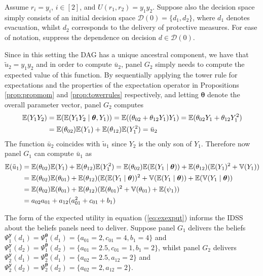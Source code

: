 Assume  $r_i=y_i$, $i\in[2]$, and $U(r_1,r_2)=y_1y_2$. Suppose also the decision space simply consists of an initial decision space $\mathcal{D}(0)=\{d_1,d_2\}$, where $d_1$ denotes evacuation, whilst $d_2$ corresponds to the delivery of protective measures. For ease of notation, suppress the dependence on decision $d\in\mathcal{D}(0)$.

Since in this setting the DAG has a unique ancestral component, we have that $\tilde{u}_2=y_1y_2$ and in order to compute $\bar{u}_2$, panel $G_2$ simply needs to compute the expected value of this function. By sequentially applying the tower rule for expectations and the properties of the expectation operator in Propositions \ref{prop:propmom} and \ref{prop:towerrules} respectively, and letting $\bm{\theta}$ denote the overall parameter vector, panel $G_2$ computes 
\begin{align*}
\mathbb{E}(Y_1Y_2)&=\mathbb{E}(\mathbb{E}(Y_1Y_2\;|\;\bm{\theta},Y_1))=\mathbb{E}((\theta_{02}+\theta_{12}Y_1)Y_1)=\mathbb{E}(\theta_{02}Y_1+\theta_{12}Y_1^2)\\
&=\mathbb{E}(\theta_{02})\mathbb{E}(Y_1)+\mathbb{E}(\theta_{12})\mathbb{E}(Y_1^2)=\bar{u}_2
\end{align*}
The function $\bar{u}_2$ coincides with $\tilde{u}_1$ since $Y_2$ is the only son of $Y_1$. Therefore now panel $G_1$ can compute $\bar{u}_1$ as
\begin{align}
\E(\tilde{u}_1)&=\E(\theta_{02})\E(Y_1)+\E(\theta_{12})\E(Y_1^2)=\E(\theta_{02})\E(\E(Y_1\;|\;\bm{\theta}))+\E(\theta_{12})(\E(Y_1)^2+\V(Y_1))\nonumber\\
&=\E(\theta_{02})\E(\theta_{01})+\E(\theta_{12})(\E(\E(Y_1\;|\;\bm{\theta}))^2+\V(\E(Y_1\;|\;\bm{\theta}))+\E(\V(Y_1\;|\;\bm{\theta}))\nonumber\\
&=\E(\theta_{02})\E(\theta_{01})+\E(\theta_{12})(\E(\theta_{01})^2+\V(\theta_{01})+\E(\psi_1))\nonumber\\
&=a_{02}a_{01}+a_{12}(a_{01}^2+c_{01}+b_1)\label{eq:exexput}
\end{align}

The form of the expected utility in equation (\ref{eq:exexput}) informs the IDSS about the beliefs panels need to deliver. Suppose panel $G_1$ delivers the beliefs $\Psi^{\bm{y}}_1(d_1)=\Psi^{\bm{\theta}}_1(d_1)=\{a_{01}=2,c_{01}=4,b_1=4\}$ and $\Psi^{\bm{y}}_1(d_2)=\Psi^{\bm{\theta}}_1(d_2)=\{a_{01}=2.5,c_{01}=1,b_1=2\}$, whilst panel $G_2$ delivers $\Psi^{\bm{y}}_2(d_1)=\Psi^{\bm{\theta}}_2(d_1)=\{a_{02}=2.5,a_{12}=2\}$ and $\Psi^{\bm{y}}_2(d_2)=\Psi^{\bm{\theta}}_2(d_2)=\{a_{02}=2,a_{12}=2\}$. 

